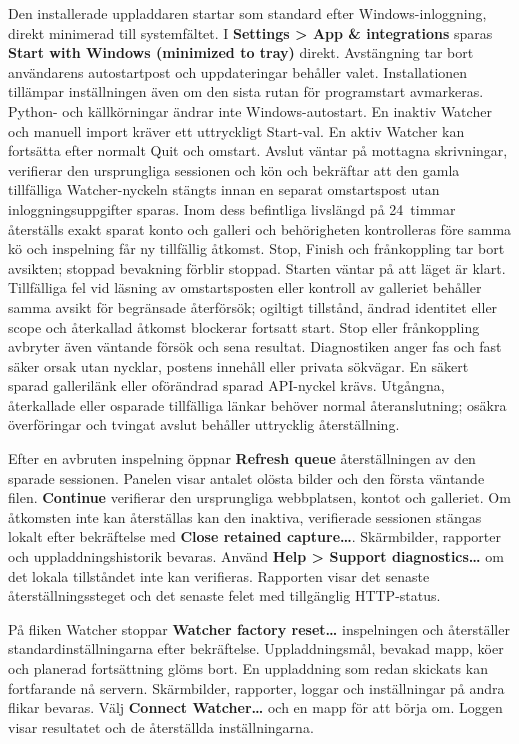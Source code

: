 \documentclass[11pt,a4paper]{article}
\newcommand{\ui}[1]{\textbf{#1}}
\begin{document}
Den installerade uppladdaren startar som standard efter Windows-inloggning,
direkt minimerad till systemfältet. I \ui{Settings > App \& integrations}
sparas \ui{Start with Windows (minimized to tray)} direkt. Avstängning tar bort
användarens autostartpost och uppdateringar behåller valet. Installationen
tillämpar inställningen även om den sista rutan för programstart avmarkeras.
Python- och källkörningar ändrar inte Windows-autostart. En inaktiv Watcher och
manuell import kräver ett uttryckligt Start-val. En aktiv Watcher kan fortsätta
efter normalt Quit och omstart. Avslut väntar på mottagna skrivningar, verifierar
den ursprungliga sessionen och kön och bekräftar att den gamla tillfälliga
Watcher-nyckeln stängts innan en separat omstartspost utan inloggningsuppgifter
sparas. Inom dess befintliga livslängd på 24~timmar återställs exakt sparat
konto och galleri och behörigheten kontrolleras före samma kö och inspelning
får ny tillfällig åtkomst. Stop, Finish och frånkoppling tar bort avsikten;
stoppad bevakning förblir stoppad. Starten väntar på att läget är klart.
Tillfälliga fel vid läsning av omstartsposten eller kontroll av galleriet
behåller samma avsikt för begränsade återförsök; ogiltigt tillstånd, ändrad
identitet eller scope och återkallad åtkomst blockerar fortsatt start. Stop
eller frånkoppling avbryter även väntande försök och sena resultat. Diagnostiken
anger fas och fast säker orsak utan nycklar, postens innehåll eller privata sökvägar.
En säkert sparad gallerilänk eller oförändrad
sparad API-nyckel krävs. Utgångna, återkallade eller osparade tillfälliga länkar
behöver normal återanslutning; osäkra överföringar och tvingat avslut behåller
uttrycklig återställning.

Efter en avbruten inspelning öppnar \ui{Refresh queue} återställningen av
den sparade sessionen. Panelen visar antalet olösta bilder och den första
väntande filen. \ui{Continue} verifierar den ursprungliga webbplatsen, kontot
och galleriet. Om åtkomsten inte kan återställas kan den inaktiva, verifierade
sessionen stängas lokalt efter bekräftelse med \ui{Close retained capture…}.
Skärmbilder, rapporter och uppladdningshistorik bevaras. Använd
\ui{Help > Support diagnostics…} om det lokala tillståndet inte kan verifieras.
Rapporten visar det senaste återställningssteget och det senaste felet med
tillgänglig HTTP-status.

På fliken Watcher stoppar \ui{Watcher factory reset…} inspelningen och
återställer standardinställningarna efter bekräftelse. Uppladdningsmål,
bevakad mapp, köer och planerad fortsättning glöms bort. En uppladdning
som redan skickats kan fortfarande nå servern. Skärmbilder, rapporter,
loggar och inställningar på andra flikar bevaras. Välj
\ui{Connect Watcher…} och en mapp för att börja om. Loggen visar resultatet
och de återställda inställningarna.
\end{document}
